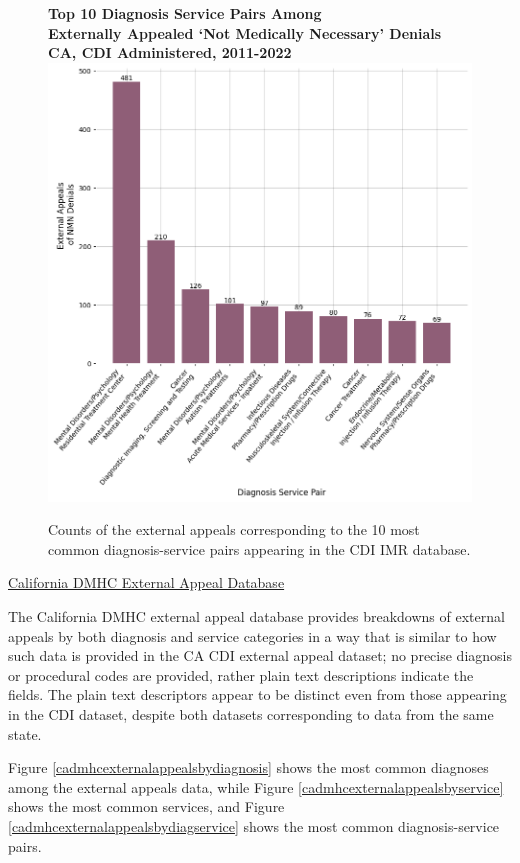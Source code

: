 \documentclass[12pt, a4paper,twoside,parskip=full]{report}
\theoremstyle{plain} %
\theoremstyle{definition} %
\theoremstyle{remark} %
\numberwithin{equation}{chapter}
\begin{document}
		\begin{figure}[h!]
			\centering
			\textbf{Top 10 Diagnosis Service Pairs Among}\\
			\textbf{Externally Appealed `Not Medically Necessary' Denials}\\
			\textbf{CA, CDI Administered, 2011-2022}\\
			\includegraphics[width=.8\textwidth]{images/ca_doi_external_appeals/top_nmn_appeal_diag_service.png}
			\caption{Counts of the external appeals corresponding to the 10 most common diagnosis-service pairs appearing in the CDI IMR database.}
			\label{cacdinmnexternalappealdiagservice}
		\end{figure}
		\clearpage
	
		\underline{California DMHC External Appeal Database}
		
		The California DMHC external appeal database provides breakdowns of external appeals by both diagnosis and service categories in a way that is similar to how such data is provided in the CA CDI external appeal dataset; no precise diagnosis or procedural codes are provided, rather plain text descriptions indicate the fields. The plain text descriptors appear to be distinct even from those appearing in the CDI dataset, despite both datasets corresponding to data from the same state.
		
		Figure \ref{cadmhcexternalappealsbydiagnosis} shows the most common diagnoses among the external appeals data, while Figure \ref{cadmhcexternalappealsbyservice} shows the most common services, and Figure \ref{cadmhcexternalappealsbydiagservice} shows the most common diagnosis-service pairs.
		
\end{document}

